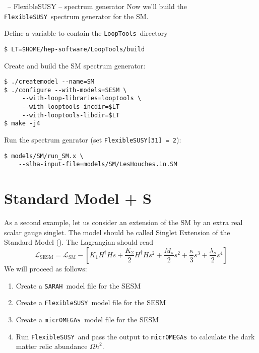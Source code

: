 \documentclass[11pt]{beamer}
\newcommand{\FlexibleSUSY}{\texttt{FlexibleSUSY}}
\newcommand{\Lagr}{\mathcal{L}}
\newcommand{\LoopTools}{\texttt{LoopTools}}
\newcommand{\micrOMEGAs}{\texttt{micrOMEGAs}}
\newcommand{\SARAH}{\texttt{SARAH}}
\newcommand{\SESM}{\text{SESM}}
\newcommand{\SM}{\text{SM}}
\begin{document}

\begin{frame}[fragile]{\insertsection\ -- FlexibleSUSY -- spectrum generator}
  Now we'll build the \FlexibleSUSY\ spectrum generator for the SM.

  \bigskip

  Define a variable to contain the \LoopTools\ directory
  \begin{lstlisting}
$ LT=$HOME/hep-software/LoopTools/build\end{lstlisting}%
  Create and build the SM spectrum generator:
  \begin{lstlisting}
$ ./createmodel --name=SM
$ ./configure --with-models=SESM \
     --with-loop-libraries=looptools \
     --with-looptools-incdir=$LT
     --with-looptools-libdir=$LT
$ make -j4\end{lstlisting}%
  Run the spectrum genrator (set \texttt{FlexibleSUSY[31] = 2}):
  \begin{lstlisting}
$ models/SM/run_SM.x \
    --slha-input-file=models/SM/LesHouches.in.SM\end{lstlisting}%
\end{frame}


\section{Standard Model + S}

\begin{frame}{\insertsection}
  As a second example, let us consider an extension of the SM by an
  extra real scalar gauge singlet. The model should be called Singlet
  Extension of the Standard Model (\SESM).  The Lagrangian should read
  \begin{equation*}
    \Lagr_{\SESM} = \Lagr_{\SM} - \left[K_1 H^\dagger H s + \frac{K_2}{2} H^\dagger H s^2 + \frac{M_s}{2} s^2 + \frac{\kappa}{3} s^3 + \frac{\lambda_s}{2} s^4\right]
  \end{equation*}
  We will proceed as follows:
  \begin{enumerate}
  \item Create a \SARAH\ model file for the SESM
  \item Create a \FlexibleSUSY\ model file for the SESM
  \item Create a \micrOMEGAs\ model file for the SESM
  \item Run \FlexibleSUSY\ and pass the output to \micrOMEGAs\ to
    calculate the dark matter relic abundance $\Omega h^2$.
  \end{enumerate}
\end{frame}
\end{document}
